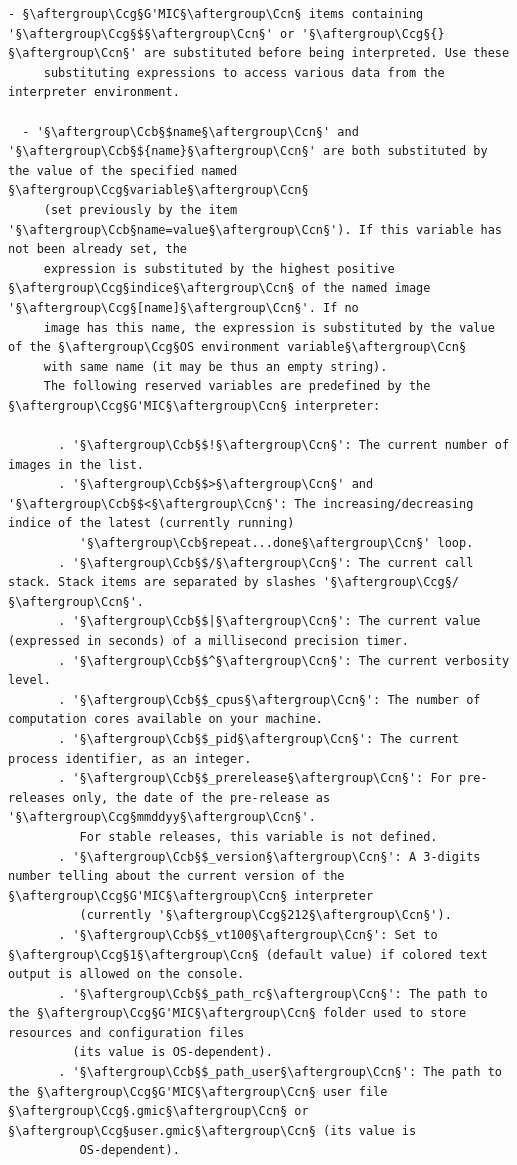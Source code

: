 \documentclass[a4paper,10.5pt,twoside]{book}
\def\Ccb{\color{cb}}
\def\Ccg{\color{cc}}
\def\Ccn{\color{black}}
\begin{document}
\begin{lstlisting}[escapechar=§]
  - §\aftergroup\Ccg§G'MIC§\aftergroup\Ccn§ items containing '§\aftergroup\Ccg§$§\aftergroup\Ccn§' or '§\aftergroup\Ccg§{}§\aftergroup\Ccn§' are substituted before being interpreted. Use these 
     substituting expressions to access various data from the interpreter environment. 
 
  - '§\aftergroup\Ccb§$name§\aftergroup\Ccn§' and '§\aftergroup\Ccb§${name}§\aftergroup\Ccn§' are both substituted by the value of the specified named §\aftergroup\Ccg§variable§\aftergroup\Ccn§ 
     (set previously by the item '§\aftergroup\Ccb§name=value§\aftergroup\Ccn§'). If this variable has not been already set, the 
     expression is substituted by the highest positive §\aftergroup\Ccg§indice§\aftergroup\Ccn§ of the named image '§\aftergroup\Ccg§[name]§\aftergroup\Ccn§'. If no 
     image has this name, the expression is substituted by the value of the §\aftergroup\Ccg§OS environment variable§\aftergroup\Ccn§ 
     with same name (it may be thus an empty string). 
     The following reserved variables are predefined by the §\aftergroup\Ccg§G'MIC§\aftergroup\Ccn§ interpreter: 
 
       . '§\aftergroup\Ccb§$!§\aftergroup\Ccn§': The current number of images in the list. 
       . '§\aftergroup\Ccb§$>§\aftergroup\Ccn§' and '§\aftergroup\Ccb§$<§\aftergroup\Ccn§': The increasing/decreasing indice of the latest (currently running) 
          '§\aftergroup\Ccb§repeat...done§\aftergroup\Ccn§' loop. 
       . '§\aftergroup\Ccb§$/§\aftergroup\Ccn§': The current call stack. Stack items are separated by slashes '§\aftergroup\Ccg§/§\aftergroup\Ccn§'. 
       . '§\aftergroup\Ccb§$|§\aftergroup\Ccn§': The current value (expressed in seconds) of a millisecond precision timer. 
       . '§\aftergroup\Ccb§$^§\aftergroup\Ccn§': The current verbosity level. 
       . '§\aftergroup\Ccb§$_cpus§\aftergroup\Ccn§': The number of computation cores available on your machine. 
       . '§\aftergroup\Ccb§$_pid§\aftergroup\Ccn§': The current process identifier, as an integer. 
       . '§\aftergroup\Ccb§$_prerelease§\aftergroup\Ccn§': For pre-releases only, the date of the pre-release as '§\aftergroup\Ccg§mmddyy§\aftergroup\Ccn§'. 
          For stable releases, this variable is not defined. 
       . '§\aftergroup\Ccb§$_version§\aftergroup\Ccn§': A 3-digits number telling about the current version of the §\aftergroup\Ccg§G'MIC§\aftergroup\Ccn§ interpreter 
          (currently '§\aftergroup\Ccg§212§\aftergroup\Ccn§'). 
       . '§\aftergroup\Ccb§$_vt100§\aftergroup\Ccn§': Set to §\aftergroup\Ccg§1§\aftergroup\Ccn§ (default value) if colored text output is allowed on the console. 
       . '§\aftergroup\Ccb§$_path_rc§\aftergroup\Ccn§': The path to the §\aftergroup\Ccg§G'MIC§\aftergroup\Ccn§ folder used to store resources and configuration files 
         (its value is OS-dependent). 
       . '§\aftergroup\Ccb§$_path_user§\aftergroup\Ccn§': The path to the §\aftergroup\Ccg§G'MIC§\aftergroup\Ccn§ user file §\aftergroup\Ccg§.gmic§\aftergroup\Ccn§ or §\aftergroup\Ccg§user.gmic§\aftergroup\Ccn§ (its value is 
          OS-dependent). 
 

\end{lstlisting}
\end{document}
